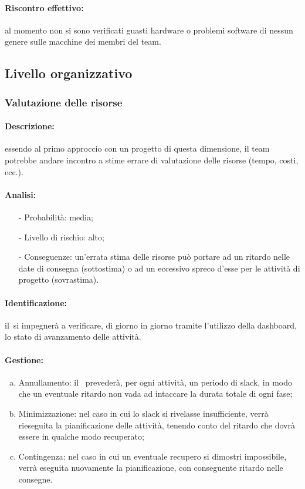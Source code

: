 \documentclass[../PianoProgetto.tex]{subfiles}
\begin{document}
	\paragraph*{Riscontro effettivo:} al momento non si sono verificati guasti hardware o problemi software di nessun genere sulle macchine dei membri del team.

\subsection{Livello organizzativo}

\subsubsection{Valutazione delle risorse}

	\paragraph*{Descrizione:} essendo al primo approccio con un progetto di questa dimensione, il team potrebbe andare incontro a stime errare di valutazione delle risorse (tempo, costi, ecc.).
	
	\paragraph*{Analisi:}
	\begin{itemize}
		\item[-] Probabilità: media;
		\item[-] Livello di rischio: alto;
		\item[-] Conseguenze: un'errata stima delle risorse può portare ad un ritardo nelle date di consegna (sottostima) o ad un eccessivo spreco d'esse per le attività di progetto (sovrastima).
	\end{itemize}
	
	\paragraph*{Identificazione:} il\responsabilediprogetto\ si impegnerà a verificare, di giorno in giorno tramite l'utilizzo della dashboard, lo stato di avanzamento delle attività.
	
	\paragraph*{Gestione:}
	\begin{enumerate}[(a)]
		\item Annullamento: il \responsabilediprogetto\ prevederà, per ogni attività, un periodo di slack, in modo che un eventuale ritardo non vada ad intaccare la durata totale di ogni fase;
		\item Minimizzazione: nel caso in cui lo slack si rivelasse insufficiente, verrà rieseguita la pianificazione delle attività, tenendo conto del ritardo che dovrà essere in qualche modo recuperato;
		\item Contingenza: nel caso in cui un eventuale recupero si dimostri impossibile, verrà eseguita nuovamente la pianificazione, con conseguente ritardo nelle consegne.
	\end{enumerate}	
	
\end{document}
